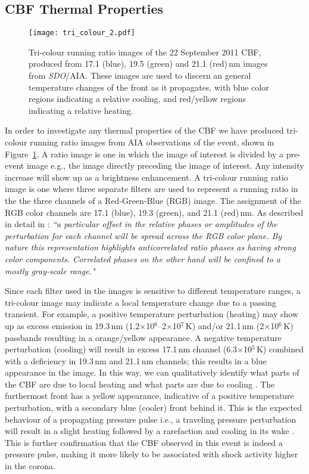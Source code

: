 \subsection{CBF Thermal Properties}
\begin{figure}[h!]
\begin{center}
\texttt{[image: tri\_colour\_2.pdf]}
\caption[Tri-colour running ratio images of a CBF.]{Tri-colour running ratio images of the 22 September 2011 CBF, produced from 17.1 (blue), 19.5 (green) and 21.1 (red)\,nm images from \emph{SDO}/AIA. These images are used to discern an general temperature changes of the front as it propagates, with blue color regions indicating a relative cooling, and red/yellow regions indicating a relative heating.}
\label{fig:tri_color}
\end{center}
\end{figure}
In order to investigate any thermal properties of the CBF we have produced tri-colour running ratio images from AIA observations of the event, shown in Figure~\ref{fig:tri_color}. A ratio image is one in which the image of interest is divided by a pre-event image e.g., the image directly preceding the image of interest. Any intensity increase will show up as a brightness enhancement. A tri-colour running ratio image is one where three separate filters are used to represent a running ratio in the the three channels of a Red-Green-Blue (RGB) image. The assignment of the RGB color channels are 17.1 (blue), 19.3 (green), and 21.1 (red)\,nm. As described in detail in \citet{downs2012}: {\it ``a particular offset in the relative phases or amplitudes of the perturbation for each channel will be spread across the RGB color plane. By nature this representation highlights anticorrelated ratio phases as having strong color components. Correlated phases on the other hand will be confined to a mostly gray-scale range."} 

Since each filter used in the images is sensitive to different temperature ranges, a tri-colour image may indicate a local temperature change due to a passing transient. For example, a positive temperature perturbation (heating) may show up as excess emission in 19.3\,nm (1.2$\times$10$^6$--2$\times$10$^7$\,K) and/or 21.1\,nm (2$\times$10$^6$\,K) passbands resulting in a orange/yellow appearance. A negative temperature perturbation (cooling) will result in excess 17.1\,nm channel (6.3$\times$10$^5$\,K) combined with a deficiency in 19.3\,nm  and 21.1\,nm channels; this results in a blue appearance in the image. In this way, we can qualitatively identify what parts of the CBF are due to local heating and what parts are due to cooling \citep{cohen2009, downs2012, cheng2012}. The furthermost front has a yellow appearance, indicative of a positive temperature perturbation, with a secondary blue (cooler) front behind it. This is the expected behaviour of a propagating pressure pulse i.e., a traveling pressure perturbation will result in a slight heating followed by a rarefaction and cooling in its wake \citet{downs2012}. This is further confirmation that the CBF observed in this event is indeed a pressure pulse, making it more likely to be associated with shock activity higher in the corona.


